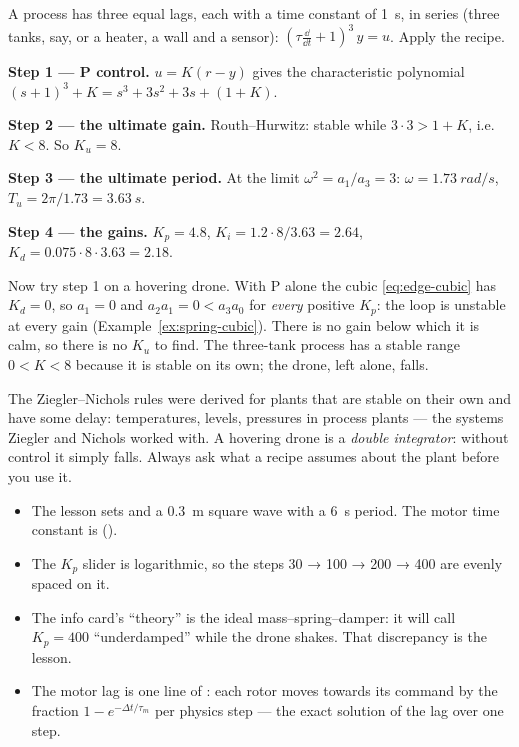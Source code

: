 \begin{example}
\label{ex:edge-zn}
A process has three equal lags, each with a time constant of \SI{1}{s}, in series (three tanks, say, or a heater, a wall and a sensor): $(\tau\frac{\dd}{\dd t} + 1)^3\,y = u$. Apply the recipe.

\textbf{Step 1 — P control.} $u = K(r - y)$ gives the characteristic polynomial $(s + 1)^3 + K = s^3 + 3s^2 + 3s + (1 + K)$.

\textbf{Step 2 — the ultimate gain.} Routh–Hurwitz: stable while $3 \cdot 3 > 1 + K$, i.e.\ $K < 8$. So $K_u = 8$.

\textbf{Step 3 — the ultimate period.} At the limit $\omega^2 = a_1/a_3 = 3$: $\omega = \SI{1.73}{rad/s}$, $T_u = 2\pi/1.73 = \SI{3.63}{s}$.

\textbf{Step 4 — the gains.} $K_p = 4.8$, $K_i = 1.2 \cdot 8/3.63 = 2.64$, $K_d = 0.075 \cdot 8 \cdot 3.63 = 2.18$.
\end{example}

Now try step 1 on a hovering drone. With P alone the cubic \eqref{eq:edge-cubic} has $K_d = 0$, so $a_1 = 0$ and $a_2a_1 = 0 < a_3a_0$ for \emph{every} positive $K_p$: the loop is unstable at every gain (Example~\ref{ex:spring-cubic}). There is no gain below which it is calm, so there is no $K_u$ to find. The three-tank process has a stable range $0 < K < 8$ because it is stable on its own; the drone, left alone, falls.

\begin{watchout}
The Ziegler–Nichols rules were derived for plants that are stable on their own and have some delay: temperatures, levels, pressures in process plants — the systems Ziegler and Nichols worked with. A hovering drone is a \emph{double integrator}: without control it simply falls. Always ask what a recipe assumes about the plant before you use it.
\end{watchout}


\begin{inapp}
\begin{itemize}[leftmargin=1.2em]
  \item The lesson sets  and a \SI{0.3}{m} square wave with a \SI{6}{s} period. The motor time constant is  ().
  \item The $K_p$ slider is logarithmic, so the steps 30 → 100 → 200 → 400 are evenly spaced on it.
  \item The info card's \enquote{theory} is the ideal mass–spring–damper: it will call $K_p = 400$ \enquote{underdamped} while the drone shakes. That discrepancy is the lesson.
  \item The motor lag is one line of : each rotor moves towards its command by the fraction $1 - e^{-\Delta t/\tau_m}$ per physics step — the exact solution of the lag over one step.
\end{itemize}
\end{inapp}

